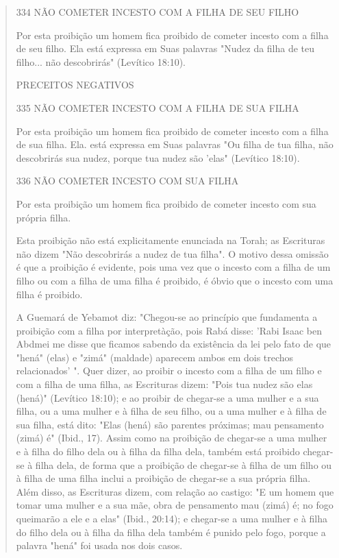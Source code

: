 \begin{quote}
334 NÃO COMETER INCESTO COM A FILHA DE SEU FILHO

Por esta proibição um homem fica proibido de cometer incesto com a filha
de seu filho. Ela está expressa em Suas palavras "Nudez da filha de teu
filho... não descobrirás" (Levítico 18:10).

PRECEITOS NEGATIVOS

335 NÃO COMETER INCESTO COM A FILHA DE SUA FILHA

Por esta proibição um homem fica proibido de cometer incesto com a filha
de sua filha. Ela. está expressa em Suas palavras "Ou filha de tua
filha, não descobrirás sua nudez, porque tua nudez são 'elas" (Levítico
18:10).

336 NÃO COMETER INCESTO COM SUA FILHA

Por esta proibição um homem fica proibido de cometer incesto com sua
própria filha.

Esta proibição não está explicitamente enunciada na Torah; as
Escri­turas não dizem "Não descobrirás a nudez de tua filha". O motivo
dessa omis­são é que a proibição é evidente, pois uma vez que o incesto
com a filha de um filho ou com a filha de uma filha é proibido, é óbvio
que o incesto com uma filha é proibido.

A Guemará de Yebamot diz: "Chegou-se ao princípio que fundamenta a
proibição com a filha por interpretàção, pois Rabá disse: 'Rabi Isaac
ben Abd­mei me disse que ficamos sabendo da existência da lei pelo fato
de que "hená" (elas) e "zimá" (maldade) aparecem ambos em dois trechos
relacionados' ". Quer dizer, ao proibir o incesto com a filha de um
filho e com a filha de uma filha, as Escrituras dizem: "Pois tua nudez
são elas (hená)" (Levítico 18:10); e ao proi­bir de chegar-se a uma
mulher e a sua filha, ou a uma mulher e à filha de seu filho, ou a uma
mulher e à filha de sua filha, está dito: "Elas (hená) são parentes
próximas; mau pensamento (zimá) é" (Ibid., 17). Assim como na proibição
de chegar-se a uma mulher e à filha do filho dela ou à filha da filha
dela, também está proibido chegar-se à filha dela, de forma que a
proibição de chegar-se à filha de um filho ou à filha de uma filha
inclui a proibição de chegar-se a sua própria filha. Além disso, as
Escrituras dizem, com relação ao castigo: "E um homem que tomar uma
mulher e a sua mãe, obra de pensamento mau (zimá) é; no fogo queimarão a
ele e a elas" (Ibid., 20:14); e chegar-se a uma mulher e à filha do
filho dela ou à filha da filha dela também é punido pelo fogo, por­que a
palavra "hená" foi usada nos dois casos.


\end{quote}
